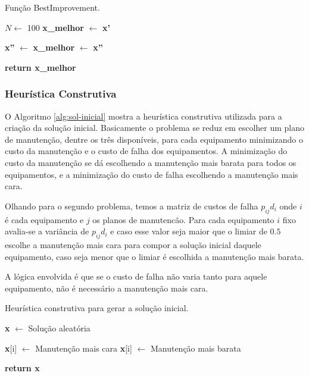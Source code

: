 \documentclass[conference]{IEEEtran}
\begin{document}
\begin{algorithm}[H]
	\caption{Função BestImprovement.}\label{alg:best-improvement}

	\begin{algorithmic}[1]

	\State $N\gets$ 100 
	\State \textbf{x\_melhor} $\gets$ \textbf{x'}

		\State \textbf{x''} $\gets$  
			\State \textbf{x\_melhor} $\gets$ \textbf{x''}
		\EndIf
	\EndFor
		
	\Statex
	\State \textbf{return x\_melhor} 
	\EndProcedure 
	\end{algorithmic}
\end{algorithm}

\subsubsection{Heurística Construtiva}

O Algoritmo \ref{alg:sol-inicial} mostra a heurística construtiva utilizada para a criação da solução inicial. Basicamente o problema se reduz
em escolher um plano de manutenção, dentre os três disponíveis, para cada equipamento minimizando o custo da manutenção e o custo de falha dos equipamentos.
A minimização do custo da manutenção se dá escolhendo a manutenção mais barata para todos os equipamentos, e a minimização do custo de falha escolhendo a manutenção mais cara.

Olhando para o segundo problema, temos a matriz de custos de falha $p_{ij}d_{i}$ onde $i$ é cada equipamento e $j$ os planos de manutencão. Para cada equipamento $i$ fixo avalia-se a
variância de $p_{ij}d_{i}$ e caso esse valor seja maior que o limiar de $0.5$ escolhe a manutenção mais cara para compor a solução inicial daquele equipamento,
caso seja menor que o limiar é escolhida a manutenção mais barata. 

A lógica envolvida é que se o custo de falha não varia tanto para aquele equipamento,
não é necessário a manutenção mais cara.

\begin{algorithm}[H]
	\caption{Heurística construtiva para gerar a solução inicial.}\label{alg:sol-inicial}
	\begin{algorithmic}[1]

	\State \textbf{x} $\gets$ Solução aleatória

			\State \textbf{x}[i] $\gets$ Manutenção mais cara
		\Else
			\State \textbf{x}[i] $\gets$ Manutenção mais barata
		\EndIf
	\EndFor
	   
	\Statex
	\State \textbf{return x} 
	\EndProcedure 
	\end{algorithmic}
\end{algorithm}
\end{document}
